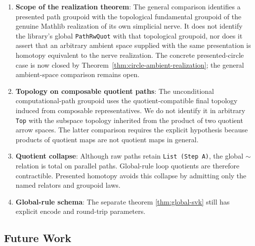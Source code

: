 \documentclass{lmcs}
\theoremstyle{definition}
\theoremstyle{plain}
\theoremstyle{remark}
\newcommand{\RwEq}{\sim}
\begin{document}
\begin{enumerate}
    \item \textbf{Scope of the realization theorem}: The general comparison
    identifies a presented path groupoid with the topological fundamental
    groupoid of the genuine Mathlib realization of its own simplicial nerve.
    It does not identify the library's global \texttt{PathRwQuot} with that
    topological groupoid, nor does it assert that an arbitrary ambient space
    supplied with the same presentation is homotopy equivalent to the nerve
    realization.  The concrete presented-circle case is now closed by
    Theorem~\ref{thm:circle-ambient-realization}; the general ambient-space
    comparison remains open.

    \item \textbf{Topology on composable quotient paths}: The unconditional
    computational-path groupoid uses the quotient-compatible final topology
    induced from composable representatives.  We do not identify it in
    arbitrary \texttt{Top} with the subspace topology inherited from the
    product of two quotient arrow spaces.  The latter comparison requires the
    explicit  hypothesis because products
    of quotient maps are not quotient maps in general.

    \item \textbf{Quotient collapse}: Although raw paths retain
    \texttt{List (Step A)}, the global \(\RwEq\) relation is total on parallel
    paths.  Global-rule loop quotients are therefore contractible.  Presented
    homotopy avoids this collapse by admitting only the named relators and
    groupoid laws.

    \item \textbf{Global-rule schema}: The separate theorem
    \ref{thm:global-svk} still has explicit encode and round-trip parameters.
\end{enumerate}

\subsection{Future Work}
\end{document}
